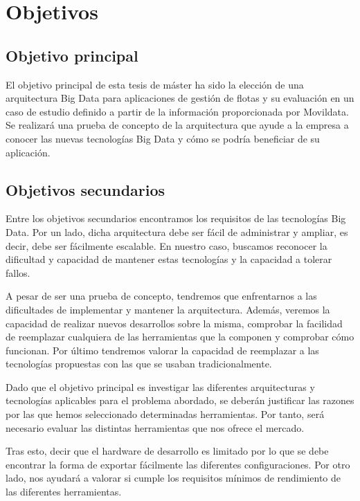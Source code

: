 \section{Objetivos\label{objetivos}}

\subsection{Objetivo principal\label{obj_princ}}

El objetivo principal de esta tesis de máster ha sido la elección de
una arquitectura Big Data para aplicaciones de gestión de flotas y su
evaluación en un caso de estudio definido a partir de la información
proporcionada por Movildata. Se realizará una prueba de concepto de la
arquitectura que ayude a la empresa a conocer las nuevas tecnologías
Big Data y cómo se podría beneficiar de su aplicación.

\subsection{Objetivos secundarios\label{obj_sec}}

Entre los objetivos secundarios encontramos los requisitos de las
tecnologías Big Data. Por un lado, dicha arquitectura debe ser fácil
de administrar y ampliar, es decir, debe ser fácilmente escalable. En
nuestro caso, buscamos reconocer la dificultad y capacidad de mantener
estas tecnologías y la capacidad a tolerar fallos.

A pesar de ser una prueba de concepto, tendremos que enfrentarnos a
las dificultades de implementar y mantener la arquitectura. Además,
veremos la capacidad de realizar nuevos desarrollos sobre la misma,
comprobar la facilidad de reemplazar cualquiera de las herramientas
que la componen y comprobar cómo funcionan. Por último tendremos
valorar la capacidad de reemplazar a las tecnologías propuestas con
las que se usaban tradicionalmente.

Dado que el objetivo principal es investigar las diferentes
arquitecturas y tecnologías aplicables para el problema abordado, se
deberán justificar las razones por las que hemos seleccionado
determinadas herramientas. Por tanto, será necesario evaluar las
distintas herramientas que nos ofrece el mercado.

Tras esto, decir que el hardware de desarrollo es limitado por lo que
se debe encontrar la forma de exportar fácilmente las diferentes
configuraciones. Por otro lado, nos ayudará a valorar si cumple los
requisitos mínimos de rendimiento de las diferentes herramientas.

